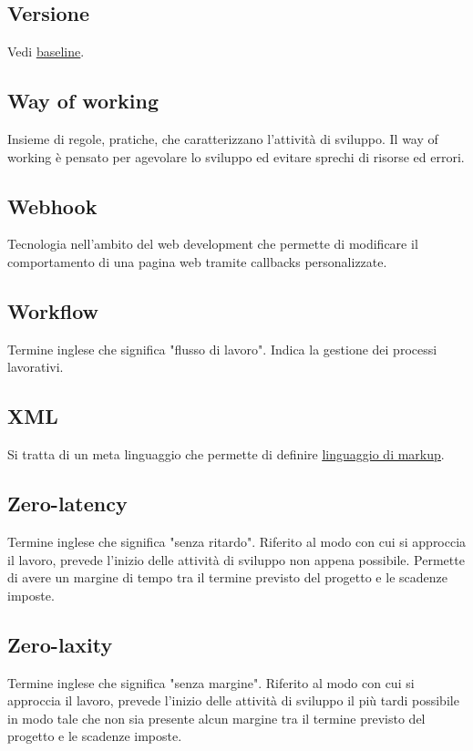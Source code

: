 	
	\subsection{Versione}
	\label{sec:versione}
	Vedi \underline{\hyperref[sec:baseline]{baseline}}.
	
	
	\newpage
	
	
	\subsection{Way of working}
	\label{sec:wow}
	Insieme di regole, pratiche, che caratterizzano l'attività di sviluppo. Il way of working è pensato per agevolare lo sviluppo ed evitare sprechi di risorse ed errori.

	
	\subsection{Webhook}
	\label{sec:webhook}
	Tecnologia nell'ambito del web development che permette di modificare il comportamento di una pagina web tramite callbacks personalizzate.


	\subsection{Workflow}
	\label{sec:workflow}
	Termine inglese che significa "flusso di lavoro". Indica la gestione dei processi lavorativi.

	 
	\newpage


	\subsection{XML}
	\label{sec:xml}
	Si tratta di un meta linguaggio che permette di definire \underline{\hyperref[sec:linguaggiomarkup]{linguaggio di markup}}.
	
	
	\newpage

	
	\subsection{Zero-latency}
	\label{sec:zerolatency}
	Termine inglese che significa "senza ritardo". Riferito al modo con cui si approccia il lavoro, prevede l'inizio delle attività di sviluppo non appena possibile. Permette di avere un margine di tempo tra il termine previsto del progetto e le scadenze imposte.

	
	\subsection{Zero-laxity}
	\label{sec:zerolaxity}
	Termine inglese che significa "senza margine". Riferito al modo con cui si approccia il lavoro, prevede l'inizio delle attività di sviluppo il più tardi possibile in modo tale che non sia presente alcun margine tra il termine previsto del progetto e le scadenze imposte.


